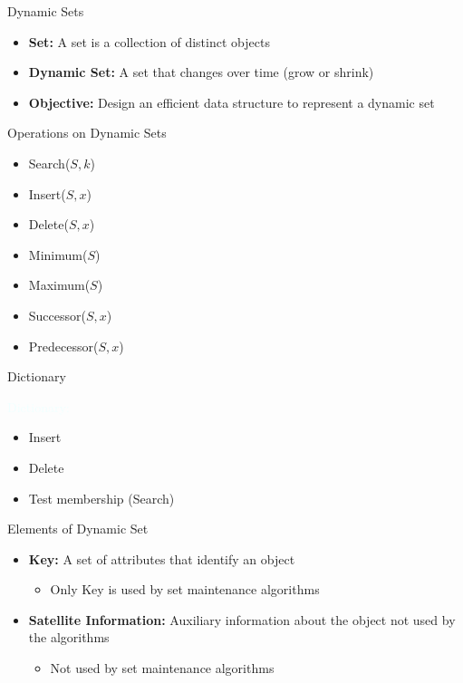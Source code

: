 \documentclass{beamer}
\newcommand{\tblue}[1]{{\Large {\textcolor{azure}{#1}}}}
\begin{document}
\begin{frame}{Dynamic Sets}
\begin{itemize}
\item {\bf Set:}  A set is a collection of distinct objects
\item {\bf Dynamic Set:} A set that changes over time (grow or shrink)
\item {\bf Objective:} Design an efficient data structure to represent a dynamic set
\end{itemize}
\end{frame}


\begin{frame}{Operations on Dynamic Sets}
\begin{itemize}
\item Search($S, k$) 
\item Insert($S, x$)
\item Delete($S, x$)
\item Minimum($S$)
\item Maximum($S$)
\item Successor($S, x$)
\item Predecessor($S, x$)
\end{itemize}
\end{frame}


\begin{frame}{Dictionary}

\tblue{Dictionary:}
\begin{itemize}
\item Insert
\item Delete
\item Test membership (Search)
\end{itemize}
\end{frame}


\begin{frame}{Elements of Dynamic Set}
\begin{itemize}
\item {\bf Key:} A set of attributes that identify an object 
\begin{itemize}
    \item Only Key is used by set maintenance algorithms
\end{itemize}
\item {\bf Satellite Information:} Auxiliary information about the object not used by the algorithms
\begin{itemize}
    \item Not used by set maintenance algorithms
\end{itemize}
\end{itemize}
\end{frame}
\end{document}
